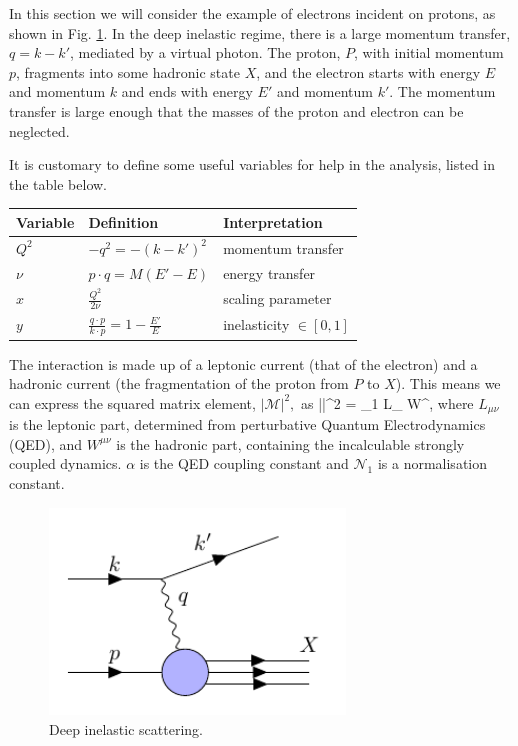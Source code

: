 In this section we will consider the example of electrons incident on protons, as shown in Fig. \ref{fig:dis}. In the deep inelastic regime, there is a large momentum transfer, $q=k-k'$, mediated by a virtual photon. The proton, $P$, with initial momentum $p$, fragments into some hadronic state $X$, and the electron starts with energy $E$ and momentum $k$ and ends with energy $E'$ and momentum $k'$. The momentum transfer is large enough that the masses of the proton and electron can be neglected. 

It is customary to define some useful variables for help in the analysis, listed in the table below.
\begin{table}[H]
\centering
\begin{tabular}{l|l|l}
  Variable & Definition & Interpretation   \\
 \hline
  $Q^2$ & $- q^2 = -(k-k')^2$   & momentum transfer    \\
  $\nu$ & $p \cdot q = M(E'-E)$ & energy transfer  \\
  $x$   & $\frac{Q^2}{2\nu}$    & scaling parameter \\
  $y$   & $\frac{q \cdot p}{k \cdot p} = 1 - \frac{E'}{E}$ & inelasticity $\in [0,1]$
\end{tabular}
\end{table}
The interaction is made up of a leptonic current (that of the electron) and a hadronic current (the fragmentation of the proton from $P$ to $X$). This means we can express the squared matrix element, $|\mathcal{M}|^2,$ as
\be
\label{eqn:matrixelement}
||^2 = _1  L_{\mu\nu} W^{\mu\nu},
\ee
where $L_{\mu\nu}$ is the leptonic part, determined from perturbative Quantum Electrodynamics (QED), and $W^{\mu\nu}$ is the hadronic part, containing the incalculable strongly coupled dynamics. $\alpha$ is the QED coupling constant and $\mathcal{N}_1$ is a normalisation constant.
\begin{figure}[H]
\centering
\includegraphics[width=0.7\textwidth]{../diagrams/disdiag.pdf}
\caption{Deep inelastic scattering. \label{fig:dis}}
\end{figure}


